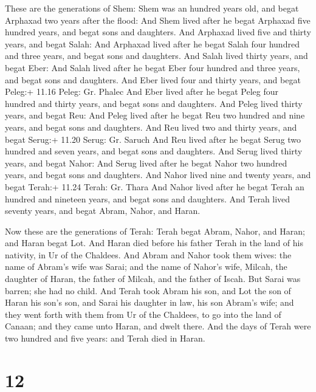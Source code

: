  These are the generations of Shem: Shem was an hundred
years old, and begat Arphaxad two years after the flood: 
And Shem lived after he begat Arphaxad five hundred years, and begat
sons and daughters.  And Arphaxad lived five and thirty
years, and begat Salah:  And Arphaxad lived after he begat
Salah four hundred and three years, and begat sons and daughters.
 And Salah lived thirty years, and begat Eber:
 And Salah lived after he begat Eber four hundred and three
years, and begat sons and daughters.  And Eber lived four
and thirty years, and begat Peleg:+ 11.16 Peleg: Gr. Phalec
 And Eber lived after he begat Peleg four hundred and
thirty years, and begat sons and daughters.  And Peleg
lived thirty years, and begat Reu:  And Peleg lived after
he begat Reu two hundred and nine years, and begat sons and daughters.
 And Reu lived two and thirty years, and begat Serug:+
11.20 Serug: Gr. Saruch  And Reu lived after he begat Serug
two hundred and seven years, and begat sons and daughters. 
And Serug lived thirty years, and begat Nahor:  And Serug
lived after he begat Nahor two hundred years, and begat sons and
daughters.  And Nahor lived nine and twenty years, and
begat Terah:+ 11.24 Terah: Gr. Thara  And Nahor lived after
he begat Terah an hundred and nineteen years, and begat sons and
daughters.  And Terah lived seventy years, and begat Abram,
Nahor, and Haran.

 Now these are the generations of Terah: Terah begat
Abram, Nahor, and Haran; and Haran begat Lot.  And Haran
died before his father Terah in the land of his nativity, in Ur of the
Chaldees.  And Abram and Nahor took them wives: the name of
Abram's wife was Sarai; and the name of Nahor's wife, Milcah, the
daughter of Haran, the father of Milcah, and the father of Iscah.
 But Sarai was barren; she had no child.  And
Terah took Abram his son, and Lot the son of Haran his son's son, and
Sarai his daughter in law, his son Abram's wife; and they went forth
with them from Ur of the Chaldees, to go into the land of Canaan; and
they came unto Haran, and dwelt there.  And the days of
Terah were two hundred and five years: and Terah died in Haran.

\hypertarget{section-11}{%
\section{12}\label{section-11}}

